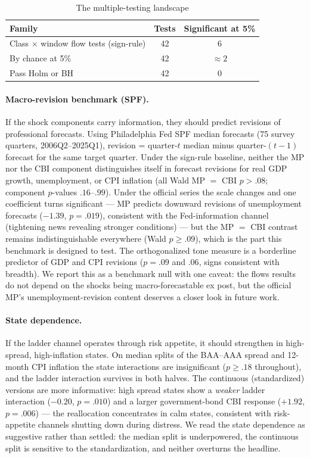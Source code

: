 \documentclass[11pt]{article}
\begin{document}
\begin{table}[H]
\centering\small
\caption{The multiple-testing landscape}
\begin{tabular}{lcc}
\toprule
Family & Tests & Significant at 5\% \\
\midrule
Class $\times$ window flow tests (sign-rule) & 42 & 6 \\
By chance at 5\% & 42 & $\approx 2$ \\
Pass Holm or BH & 42 & 0 \\
\bottomrule
\end{tabular}
\label{tab:multiple}
\end{table}


\paragraph{Macro-revision benchmark (SPF).} If the shock components carry
information, they should predict revisions of professional forecasts. Using
Philadelphia Fed SPF median forecasts (75 survey quarters, 2006Q2--2025Q1),
revision = quarter-$t$ median minus quarter-$(t-1)$ forecast for the same
target quarter. Under the sign-rule baseline, neither the MP nor the CBI
component distinguishes itself in forecast revisions for real GDP growth,
unemployment, or CPI inflation (all Wald MP $=$ CBI $p > .08$; component
$p$-values $.16$--$.99$). Under the official series the scale changes and
one coefficient turns significant --- MP predicts downward revisions of
unemployment forecasts ($-1.39$, $p=.019$), consistent with the
Fed-information channel (tightening news revealing stronger conditions) ---
but the MP $=$ CBI
contrast remains indistinguishable everywhere (Wald $p \geq .09$), which is
the part this benchmark is designed to test. The orthogonalized tone
measure is a borderline predictor of GDP and CPI revisions
($p = .09$ and $.06$, signs consistent with breadth). We report this as a
benchmark null with one caveat: the flows results do not depend on the
shocks being macro-forecastable ex post, but the official MP's
unemployment-revision content deserves a closer look in future work.

\paragraph{State dependence.} If the ladder channel operates through
risk appetite, it should strengthen in high-spread, high-inflation states.
On median splits of the BAA--AAA spread and 12-month CPI inflation the
state interactions are insignificant ($p \geq .18$ throughout), and the
ladder interaction survives in both halves. The continuous (standardized)
versions are more informative: high spread states show a \emph{weaker}
ladder interaction ($-0.20$, $p=.010$) and a larger government-bond CBI
response ($+1.92$, $p=.006$) --- the reallocation concentrates in calm
states, consistent with risk-appetite channels shutting down during
distress. We read the state dependence as suggestive rather than settled:
the median split is underpowered, the continuous split is sensitive to the
standardization, and neither overturns the headline.
\end{document}
